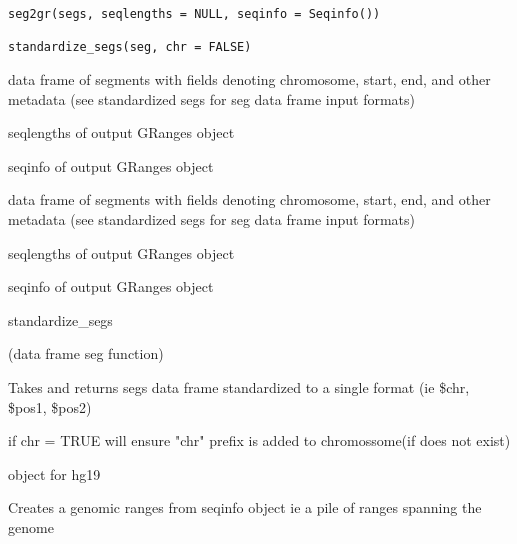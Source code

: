 \documentclass[a4paper]{book}
\begin{document}
%
\begin{Usage}
\begin{verbatim}
seg2gr(segs, seqlengths = NULL, seqinfo = Seqinfo())

standardize_segs(seg, chr = FALSE)
\end{verbatim}
\end{Usage}
%
\begin{Arguments}
\begin{ldescription}
\item[\code{segs}] data frame of segments with fields denoting chromosome, start, end, and other metadata (see standardized segs for seg data frame input formats)

\item[\code{seqlengths}] seqlengths of output GRanges object

\item[\code{seqinfo}] seqinfo of output GRanges object

\item[\code{segs}] data frame of segments with fields denoting chromosome, start, end, and other metadata (see standardized segs for seg data frame input formats)

\item[\code{seqlengths}] seqlengths of output GRanges object

\item[\code{seqinfo}] seqinfo of output GRanges object
\end{ldescription}
\end{Arguments}
%
\begin{Details}\relax
standardize\_segs

(data frame seg function)

Takes and returns segs data frame standardized to a single format (ie \$chr, \$pos1, \$pos2)

if chr = TRUE will ensure "chr" prefix is added to chromossome(if does not exist)
\end{Details}
%
\begin{Description}\relax
{} object for hg19
\end{Description}
%
\begin{Format}
\end{Format}
%
\begin{Description}\relax
Creates a genomic ranges from seqinfo object
ie a pile of ranges spanning the genome
\end{Description}
\end{document}

